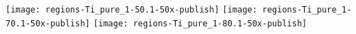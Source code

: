 \documentclass{standalone}
\begin{document}
\texttt{[image: regions-Ti\_pure\_1-50.1-50x-publish]}
\texttt{[image: regions-Ti\_pure\_1-70.1-50x-publish]}
\texttt{[image: regions-Ti\_pure\_1-80.1-50x-publish]}
\end{document}
